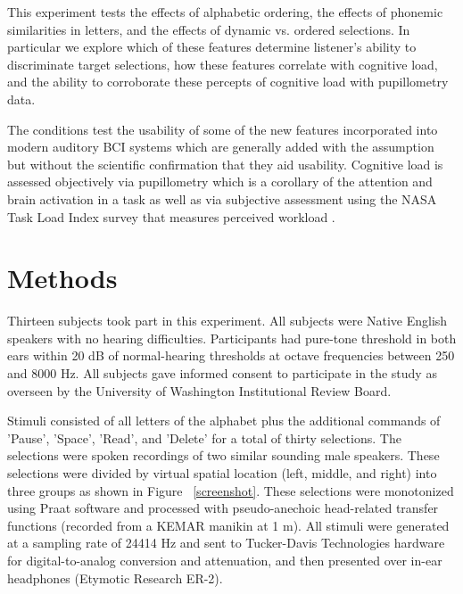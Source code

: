 \documentclass[12pt]{article}
\begin{document}
This experiment tests the effects of alphabetic ordering, the
effects of phonemic similarities in letters, and the
effects of dynamic vs. ordered selections.  In particular we explore 
which of these features determine listener's ability to discriminate
target selections, how these features correlate with cognitive load,
and the ability to corroborate these percepts of cognitive load with
pupillometry data.

The conditions test the usability of some of the new features
incorporated into modern auditory BCI systems which are generally
added with the assumption but without the scientific confirmation
that they aid usability.  Cognitive load is assessed objectively via
pupillometry which is a corollary of the attention and brain
activation in a task as well as via subjective assessment using the
NASA Task Load Index survey that measures perceived workload
\cite{Zickler2013a}.  




\section{Methods}

Thirteen subjects took part in this experiment.  All subjects were
Native English speakers with no hearing difficulties.  Participants
had pure-tone threshold in both ears within 20 dB of normal-hearing
thresholds at octave frequencies between 250 and 8000 Hz.  All
subjects gave informed consent to participate in the study as
overseen by the University of Washington Institutional Review Board.

Stimuli consisted of all letters of the alphabet plus the additional
commands of 'Pause', 'Space', 'Read', and 'Delete' for a total of
thirty selections. The selections were spoken recordings of two
similar sounding male speakers.  These selections were divided by
virtual spatial location (left, middle, and right) into three groups
as shown in Figure ~\ref{screenshot}.  These selections were
monotonized using Praat software and processed with pseudo-anechoic
head-related transfer functions (recorded from a KEMAR manikin at 1
m).  All stimuli were generated at a sampling rate of 24414 Hz and
sent to Tucker-Davis Technologies hardware for digital-to-analog
conversion and attenuation, and then presented over in-ear
headphones (Etymotic Research ER-2).
\end{document}
